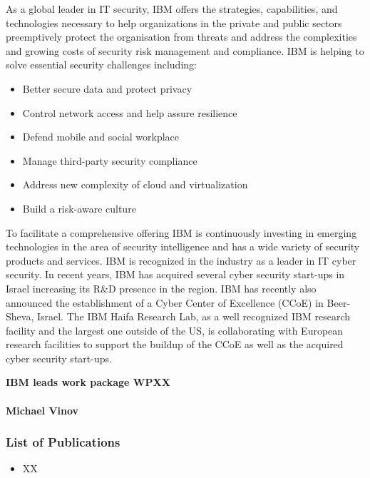 \documentclass[a4paper,11pt]{article}
\begin{document}
As a global leader in IT security, IBM offers the strategies, capabilities, and technologies necessary to help organizations in the private and public sectors preemptively protect the organisation from threats and address the complexities and growing costs of security risk management and compliance. IBM is helping to solve essential security challenges including:
\begin{itemize}
\item
  Better secure data and protect privacy
\item
	Control network access and help assure resilience
\item
	Defend mobile and social workplace
\item
	Manage third-party security compliance
\item
	Address new complexity of cloud and virtualization
\item
	Build a risk-aware culture
\end{itemize} 	
To facilitate a comprehensive offering IBM is continuously investing in emerging technologies in the area of security intelligence and has a wide variety of security products and services. IBM is recognized in the industry as a leader in IT cyber security.
In recent years, IBM has acquired several cyber security start-ups in Israel increasing its R\&D presence in the region. IBM has recently also announced the establishment of a Cyber Center of Excellence (CCoE) in Beer-Sheva, Israel. The IBM Haifa Research Lab, as a well recognized IBM research facility and the largest one outside of the US, is collaborating with European research facilities to support the buildup of the CCoE as well as the acquired cyber security start-ups.

\vspace{10pt}
\textbf{IBM leads work package WPXX}

\vspace{10pt}

\paragraph{Michael Vinov}     

\subsubsection*{List of Publications}


\begin{itemize}
\item XX
\end{itemize}
\end{document}

